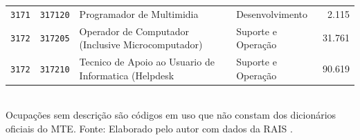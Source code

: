 \begin{quadro}[htbp]
\begin{tabular}{llp{6.2cm}p{3.4cm}r}
        \texttt{3171} & \texttt{317120} & Programador de Multimidia & Desenvolvimento & 2.115 \\
        \texttt{3172} & \texttt{317205} & Operador de Computador (Inclusive Microcomputador) & Suporte e Operação & 31.761 \\
        \texttt{3172} & \texttt{317210} & Tecnico de Apoio ao Usuario de Informatica (Helpdesk & Suporte e Operação & 90.619 \\
        \bottomrule
    \end{tabular}
    \\[4pt]
    Ocupações sem descrição são códigos em uso que não constam dos dicionários oficiais do MTE. Fonte: Elaborado pelo autor com dados da RAIS \cite{RAIS2024}.
\end{quadro}

